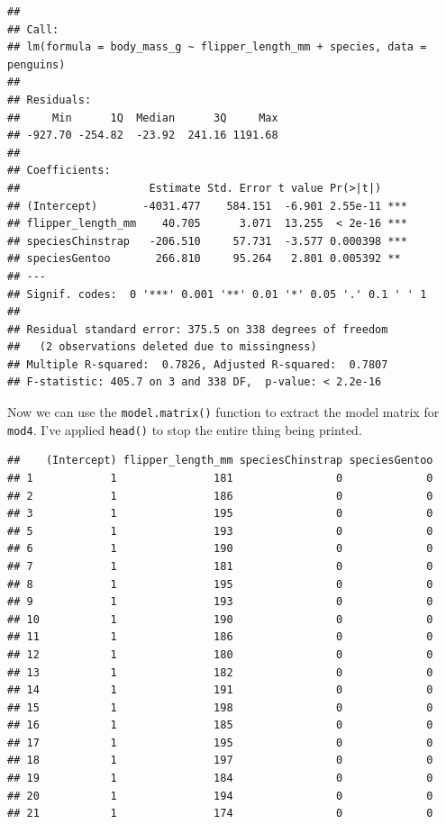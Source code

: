 \documentclass[
  openany]{book}
\begin{document}
\begin{verbatim}
## 
## Call:
## lm(formula = body_mass_g ~ flipper_length_mm + species, data = penguins)
## 
## Residuals:
##     Min      1Q  Median      3Q     Max 
## -927.70 -254.82  -23.92  241.16 1191.68 
## 
## Coefficients:
##                    Estimate Std. Error t value Pr(>|t|)    
## (Intercept)       -4031.477    584.151  -6.901 2.55e-11 ***
## flipper_length_mm    40.705      3.071  13.255  < 2e-16 ***
## speciesChinstrap   -206.510     57.731  -3.577 0.000398 ***
## speciesGentoo       266.810     95.264   2.801 0.005392 ** 
## ---
## Signif. codes:  0 '***' 0.001 '**' 0.01 '*' 0.05 '.' 0.1 ' ' 1
## 
## Residual standard error: 375.5 on 338 degrees of freedom
##   (2 observations deleted due to missingness)
## Multiple R-squared:  0.7826, Adjusted R-squared:  0.7807 
## F-statistic: 405.7 on 3 and 338 DF,  p-value: < 2.2e-16
\end{verbatim}

Now we can use the \texttt{model.matrix()} function to extract the model matrix for \texttt{mod4}. I've applied \texttt{head()} to stop the entire thing being printed.

\begin{verbatim}
##    (Intercept) flipper_length_mm speciesChinstrap speciesGentoo
## 1            1               181                0             0
## 2            1               186                0             0
## 3            1               195                0             0
## 5            1               193                0             0
## 6            1               190                0             0
## 7            1               181                0             0
## 8            1               195                0             0
## 9            1               193                0             0
## 10           1               190                0             0
## 11           1               186                0             0
## 12           1               180                0             0
## 13           1               182                0             0
## 14           1               191                0             0
## 15           1               198                0             0
## 16           1               185                0             0
## 17           1               195                0             0
## 18           1               197                0             0
## 19           1               184                0             0
## 20           1               194                0             0
## 21           1               174                0             0
\end{verbatim}
\end{document}
